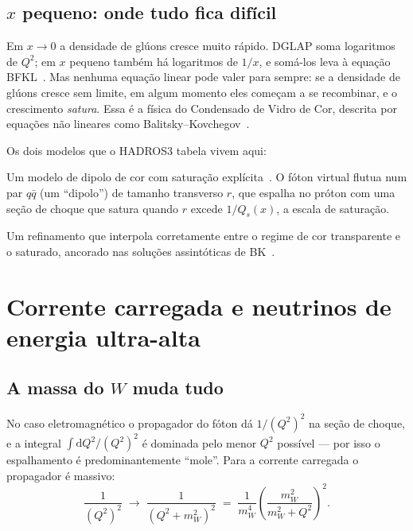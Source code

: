 \documentclass[11pt,a4paper,oneside]{report}
\newcommand{\md}{\mathrm{d}}
\newcommand{\Qsq}{Q^{2}}
\begin{document}
\section{$x$ pequeno: onde tudo fica difícil}

Em $x \to 0$ a densidade de glúons cresce muito rápido. DGLAP soma logaritmos de
$\Qsq$; em $x$ pequeno também há logaritmos de $1/x$, e somá-los leva à equação
BFKL~\cite{Balitsky:1978ic}. Mas nenhuma equação linear pode valer para sempre:
se a densidade de glúons cresce sem limite, em algum momento eles começam a se
recombinar, e o crescimento \emph{satura}. Essa é a física do Condensado de Vidro
de Cor, descrita por equações não lineares como
Balitsky--Kovchegov~\cite{Balitsky:1995ub,Kovchegov:1999yj}.

Os dois modelos que o HADROS3 tabela vivem aqui:

\begin{description}[style=nextline,leftmargin=0pt,font=\sffamily\bfseries\color{acento}]
\item[GBW (Golec-Biernat--Wüsthoff)] Um modelo de dipolo de cor com saturação
  explícita~\cite{Golec-Biernat:1998zce,Golec-Biernat:1999qor}. O fóton virtual
  flutua num par $q\bar q$ (um ``dipolo'') de tamanho transverso $r$, que espalha
  no próton com uma seção de choque que satura quando $r$ excede
  $1/Q_s(x)$, a escala de saturação.
\item[IIM (Iancu--Itakura--Munier)] Um refinamento que interpola corretamente
  entre o regime de cor transparente e o saturado, ancorado nas soluções
  assintóticas de BK~\cite{Iancu:2003ge}.
\end{description}

\chapter{Corrente carregada e neutrinos de energia ultra-alta}
\label{cap:cc}

\section{A massa do $W$ muda tudo}

No caso eletromagnético o propagador do fóton dá $1/(\Qsq)^{2}$ na seção de choque, e
a integral $\int \md \Qsq/(\Qsq)^{2}$ é dominada pelo menor $\Qsq$ possível --- por
isso o espalhamento é predominantemente ``mole''. Para a corrente carregada o
propagador é massivo:
\begin{equation}
  \frac{1}{(\Qsq)^{2}} \;\longrightarrow\;
  \frac{1}{(\Qsq + m_W^2)^2}
  \;=\;\frac{1}{m_W^4}\left(\frac{m_W^2}{m_W^2+\Qsq}\right)^{\!2}.
\end{equation}
\end{document}
